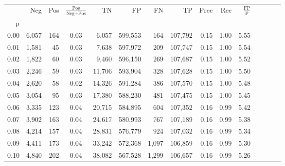 \begin{tabular}{rrrcrrrrrrrrrrr}
\toprule
{} &     Neg &    Pos & $\frac{\text{Pos}}{\text{Neg}+\text{Pos}}$ &       TN &       FP &       FN &       TP &  Prec &   Rec & $\frac{\text{FP}}{\text{P}}$ \\
p    &         &        &                                            &          &          &          &          &       &       &                              \\
\midrule
0.00 &   6,057 &    164 &                                       0.03 &    6,057 &  599,553 &      164 &  107,792 &  0.15 &  1.00 &                         5.55 \\
0.01 &   1,581 &     45 &                                       0.03 &    7,638 &  597,972 &      209 &  107,747 &  0.15 &  1.00 &                         5.54 \\
0.02 &   1,822 &     60 &                                       0.03 &    9,460 &  596,150 &      269 &  107,687 &  0.15 &  1.00 &                         5.52 \\
0.03 &   2,246 &     59 &                                       0.03 &   11,706 &  593,904 &      328 &  107,628 &  0.15 &  1.00 &                         5.50 \\
0.04 &   2,620 &     58 &                                       0.02 &   14,326 &  591,284 &      386 &  107,570 &  0.15 &  1.00 &                         5.48 \\
0.05 &   3,054 &     95 &                                       0.03 &   17,380 &  588,230 &      481 &  107,475 &  0.15 &  1.00 &                         5.45 \\
0.06 &   3,335 &    123 &                                       0.04 &   20,715 &  584,895 &      604 &  107,352 &  0.16 &  0.99 &                         5.42 \\
0.07 &   3,902 &    163 &                                       0.04 &   24,617 &  580,993 &      767 &  107,189 &  0.16 &  0.99 &                         5.38 \\
0.08 &   4,214 &    157 &                                       0.04 &   28,831 &  576,779 &      924 &  107,032 &  0.16 &  0.99 &                         5.34 \\
0.09 &   4,411 &    173 &                                       0.04 &   33,242 &  572,368 &    1,097 &  106,859 &  0.16 &  0.99 &                         5.30 \\
0.10 &   4,840 &    202 &                                       0.04 &   38,082 &  567,528 &    1,299 &  106,657 &  0.16 &  0.99 &                         5.26 \\

\end{tabular}
